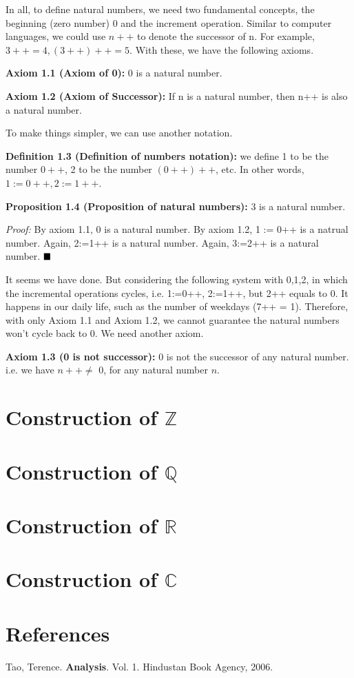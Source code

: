 \documentclass[12pt,openany]{book}
\theoremstyle{definition}
\theoremstyle{definition}
\begin{document}
In all, to define natural numbers, we need two fundamental concepts, the beginning (zero number) $0$ and the increment operation. Similar to computer languages, we could use $n++$ to denote the successor of n. For example, $3++ = 4, (3++)++ = 5$. With these, we have the following axioms.

\noindent\textbf{Axiom 1.1 (Axiom of 0):} 0 is a natural number.

\noindent\textbf{Axiom 1.2 (Axiom of Successor):} If n is a natural number, then n++ is also a natural number.

To make things simpler, we can use another notation.

\noindent\textbf{Definition 1.3 (Definition of numbers notation):} we define 1 to be the number $0++$, 2 to be the number $(0++)++$, etc. In other words, $1 := 0++, 2 := 1++$.

\noindent\textbf{Proposition 1.4 (Proposition of natural numbers):} 3 is a natural number.

\textit{Proof:} By axiom 1.1, 0 is a natural number. By axiom 1.2, 1 := 0++ is a natrual number. Again, 2:=1++ is a natural number. Again, 3:=2++ is a natural number. $\hfill\blacksquare$

It seems we have done. But considering the following system with 0,1,2, in which the incremental operations cycles, i.e. 1:=0++, 2:=1++, but 2++ equals to 0. It happens in our daily life, such as the number of weekdays (7++ = 1). Therefore, with only Axiom 1.1 and Axiom 1.2, we cannot guarantee the natural numbers won't cycle back to 0. We need another axiom.

\noindent\textbf{Axiom 1.3 (0 is not successor):} 0 is not the successor of any natural number. i.e. we have $ n++ \neq$ 0, for any natural number $n$.

\chapter{Construction of $\mathbb{Z}$}

\chapter{Construction of $\mathbb{Q}$}

\chapter{Construction of $\mathbb{R}$}

\chapter{Construction of $\mathbb{C}$}

\chapter{References}

Tao, Terence. \textbf{Analysis}. Vol. 1. Hindustan Book Agency, 2006.
\end{document}
